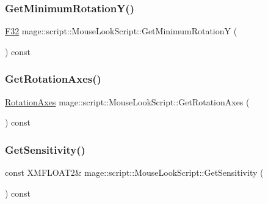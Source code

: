 \subsubsection{\texorpdfstring{Get\+Minimum\+Rotation\+Y()}{GetMinimumRotationY()}}
{\footnotesize\ttfamily \hyperlink{namespacemage_aa97e833b45f06d60a0a9c4fc22ae02c0}{F32} mage\+::script\+::\+Mouse\+Look\+Script\+::\+Get\+Minimum\+RotationY (\begin{DoxyParamCaption}{ }\end{DoxyParamCaption}) const\hspace{0.3cm}{\ttfamily [noexcept]}}

\hypertarget{classmage_1_1script_1_1_mouse_look_script_a612d8c23cc3f0711a07b32304082dfb5}{}\label{classmage_1_1script_1_1_mouse_look_script_a612d8c23cc3f0711a07b32304082dfb5} 
\subsubsection{\texorpdfstring{Get\+Rotation\+Axes()}{GetRotationAxes()}}
{\footnotesize\ttfamily \hyperlink{classmage_1_1script_1_1_mouse_look_script_aa8c8ce1a3e6ccefa7b8ddd31be209c23}{Rotation\+Axes} mage\+::script\+::\+Mouse\+Look\+Script\+::\+Get\+Rotation\+Axes (\begin{DoxyParamCaption}{ }\end{DoxyParamCaption}) const\hspace{0.3cm}{\ttfamily [noexcept]}}

\hypertarget{classmage_1_1script_1_1_mouse_look_script_a5dbf9911e65f1462e2ca84f70b8871d9}{}\label{classmage_1_1script_1_1_mouse_look_script_a5dbf9911e65f1462e2ca84f70b8871d9} 
\subsubsection{\texorpdfstring{Get\+Sensitivity()}{GetSensitivity()}}
{\footnotesize\ttfamily const X\+M\+F\+L\+O\+A\+T2\& mage\+::script\+::\+Mouse\+Look\+Script\+::\+Get\+Sensitivity (\begin{DoxyParamCaption}{ }\end{DoxyParamCaption}) const\hspace{0.3cm}{\ttfamily [noexcept]}}

